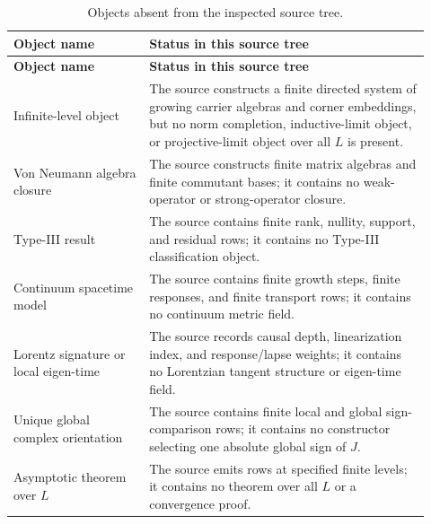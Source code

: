 \documentclass[11pt]{article}
\theoremstyle{remark}
\numberwithin{equation}{section}
\begin{document}
\begin{longtable}{>{\raggedright\arraybackslash}p{0.30\linewidth}>{\raggedright\arraybackslash}p{0.62\linewidth}}
\caption{Objects absent from the inspected source tree.}\label{tab:absent-objects}\\
\toprule
\textbf{Object name} & \textbf{Status in this source tree}\\
\midrule
\endfirsthead
\toprule
\textbf{Object name} & \textbf{Status in this source tree}\\
\midrule
\endhead
Infinite-level object & The source constructs a finite directed system of growing carrier algebras and corner embeddings, but no norm completion, inductive-limit object, or projective-limit object over all $L$ is present.\\
\hline
Von Neumann algebra closure & The source constructs finite matrix algebras and finite commutant bases; it contains no weak-operator or strong-operator closure.\\
\hline
Type-III result & The source contains finite rank, nullity, support, and residual rows; it contains no Type-III classification object.\\
\hline
Continuum spacetime model & The source contains finite growth steps, finite responses, and finite transport rows; it contains no continuum metric field.\\
\hline
Lorentz signature or local eigen-time & The source records causal depth, linearization index, and response/lapse weights; it contains no Lorentzian tangent structure or eigen-time field.\\
\hline
Unique global complex orientation & The source contains finite local and global sign-comparison rows; it contains no constructor selecting one absolute global sign of $J$.\\
\hline
Asymptotic theorem over $L$ & The source emits rows at specified finite levels; it contains no theorem over all $L$ or a convergence proof.\\
\bottomrule
\end{longtable}

\newpage
\end{document}
